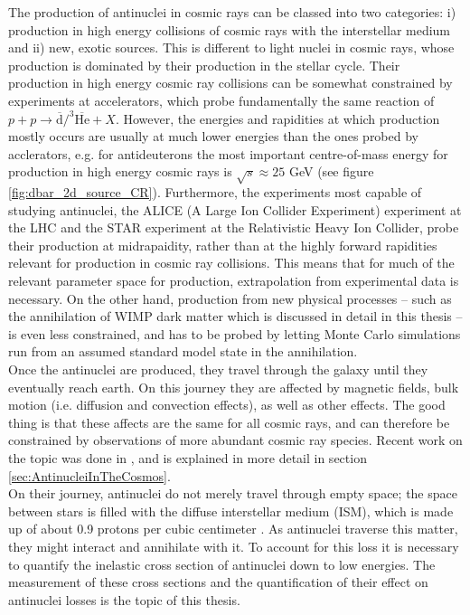 The production of antinuclei in cosmic rays can be classed into two categories: i) production in high energy collisions of cosmic rays with the interstellar medium and ii) new, exotic sources. This is different to light nuclei in cosmic rays, whose production is dominated by their production in the stellar cycle. Their production in high energy cosmic ray collisions can be somewhat constrained by experiments at accelerators, which probe fundamentally the same reaction of $p + p \rightarrow \overline{\mathrm{d}}/^3{\overline{\mathrm{He}}} + X$. However, the energies and rapidities at which production mostly occurs are usually at much lower energies than the ones probed by acclerators, e.g. for antideuterons the most important centre-of-mass energy for production in high energy cosmic rays is $\sqrt{s}\approx 25$ GeV (see figure \ref{fig:dbar_2d_source_CR}). Furthermore, the experiments most capable of studying antinuclei, the ALICE (A Large Ion Collider Experiment) experiment at the LHC and the STAR experiment \cite{Xu_2014} at the Relativistic Heavy Ion Collider, probe their production at midrapaidity, rather than at the highly forward rapidities relevant for production in cosmic ray collisions. This means that for much of the relevant parameter space for production, extrapolation from experimental data is necessary. On the other hand, production from new physical processes -- such as the annihilation of WIMP dark matter which is discussed in detail in this thesis -- is even less constrained, and has to be probed by letting Monte Carlo simulations run from an assumed standard model state in the annihilation. \\

Once the antinuclei are produced, they travel through the galaxy until they eventually reach earth. On this journey they are affected by magnetic fields, bulk motion (i.e. diffusion and convection effects), as well as other effects. The good thing is that these affects are the same for all cosmic rays, and can therefore be constrained by observations of more abundant cosmic ray species. Recent work on the topic was done in \cite{Boschini:2017fxq, Boschini:2018baj}, and is explained in more detail in section \ref{sec:AntinucleiInTheCosmos}. \\

On their journey, antinuclei do not merely travel through empty space; the space between stars is filled with the diffuse interstellar medium (ISM), which is made up of about 0.9 protons per cubic centimeter \cite{Ferri_re_2001}. As antinuclei traverse this matter, they might interact and annihilate with it. To account for this loss it is necessary to quantify the inelastic cross section of antinuclei down to low energies. The measurement of these cross sections and the quantification of their effect on antinuclei losses is the topic of this thesis. 
